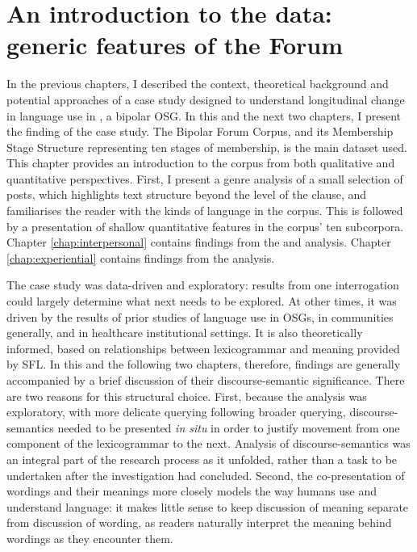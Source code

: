 
\chapter{An introduction to the data: generic features of the Forum} \label{chap:introdata}

In the previous chapters, I described the context, theoretical background and potential approaches of a case study designed to understand longitudinal change in language use in \emph{}, a \gls{bipolar} \gls{OSG}. In this and the next two chapters, I present the finding of the case study. The Bipolar Forum Corpus, and its Membership Stage Structure representing ten stages of membership, is the main dataset used. This chapter provides an introduction to the \gls{corpus} from both qualitative and quantitative perspectives. First, I present a genre analysis of a small selection of \glspl{post}, which highlights text structure beyond the level of the clause, and familiarises the reader with the kinds of language in the \gls{corpus}. This is followed by a presentation of shallow quantitative features in the \gls{corpus}' ten subcorpora. Chapter \ref{chap:interpersonal} contains findings from the  and  analysis. Chapter \ref{chap:experiential} contains findings from the  analysis.

The case study was data\hyp{}driven and exploratory: results from one interrogation could largely determine what next needs to be explored. At other times, it was driven by the results of prior studies of language use in \glspl{OSG}, in communities generally, and in healthcare institutional settings. It is also theoretically informed, based on relationships between \gls{lexicogrammar} and meaning provided by \gls{SFL}. In this and the following two chapters, therefore, findings are generally accompanied by a brief discussion of their \gls{discourse-semantic} significance. There are two reasons for this structural choice. First, because the analysis was exploratory, with more delicate querying following broader querying, \glspl{discourse-semantic} needed to be presented \emph{in situ} in order to justify movement from one component of the \gls{lexicogrammar} to the next. Analysis of \glspl{discourse-semantic} was an integral part of the research process as it unfolded, rather than a task to be undertaken after the investigation had concluded. Second, the co\hyp{}presentation of wordings and their meanings more closely models the way humans use and understand language: it makes little sense to keep discussion of meaning separate from discussion of wording, as readers naturally interpret the meaning behind wordings as they encounter them.

